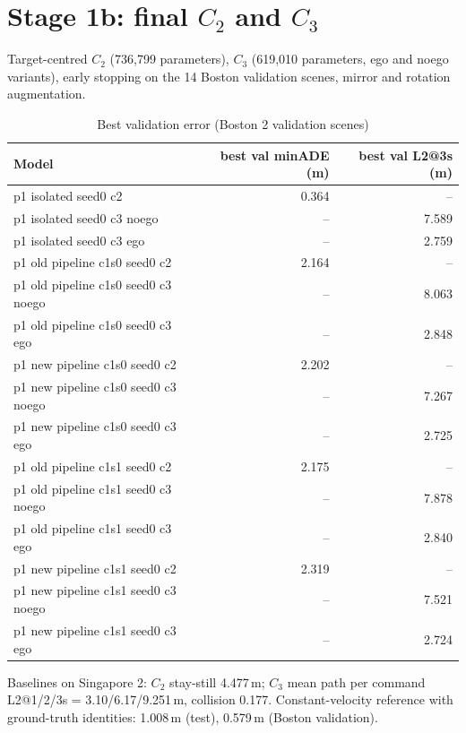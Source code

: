 \documentclass[10pt,a4paper]{article}
\begin{document}
\section{Stage 1b: final $C_2$ and $C_3$}
Target-centred $C_2$ (736{,}799 parameters), $C_3$ (619{,}010 parameters, ego and noego variants), early stopping on the 14 Boston validation scenes, mirror and rotation augmentation.
\begin{table}[h]\centering\small\caption{Best validation error (Boston 2 validation scenes)}
\begin{tabular}{lrr}\toprule Model & best val minADE (m) & best val L2@3s (m)\\\midrule
p1 isolated seed0 c2 & 0.364 & --\\
p1 isolated seed0 c3 noego & -- & 7.589\\
p1 isolated seed0 c3 ego & -- & 2.759\\
p1 old pipeline c1s0 seed0 c2 & 2.164 & --\\
p1 old pipeline c1s0 seed0 c3 noego & -- & 8.063\\
p1 old pipeline c1s0 seed0 c3 ego & -- & 2.848\\
p1 new pipeline c1s0 seed0 c2 & 2.202 & --\\
p1 new pipeline c1s0 seed0 c3 noego & -- & 7.267\\
p1 new pipeline c1s0 seed0 c3 ego & -- & 2.725\\
p1 old pipeline c1s1 seed0 c2 & 2.175 & --\\
p1 old pipeline c1s1 seed0 c3 noego & -- & 7.878\\
p1 old pipeline c1s1 seed0 c3 ego & -- & 2.840\\
p1 new pipeline c1s1 seed0 c2 & 2.319 & --\\
p1 new pipeline c1s1 seed0 c3 noego & -- & 7.521\\
p1 new pipeline c1s1 seed0 c3 ego & -- & 2.724\\
\bottomrule\end{tabular}\end{table}
Baselines on Singapore 2: $C_2$ stay-still 4.477\,m; $C_3$ mean path per command L2@1/2/3s = 3.10/6.17/9.251\,m, collision 0.177. Constant-velocity reference with ground-truth identities: 1.008\,m (test), 0.579\,m (Boston validation).
\end{document}
